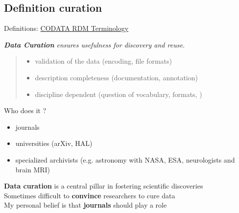 \documentclass[10pt,compress,serif,aspectratio=169]{beamer}
\begin{document}

%



\subsection{Definition curation}
\begin{frame}{Definitions: \href{https://zenodo.org/records/10626170}{CODATA RDM Terminology}}

\textit{\textbf{Data Curation} ensures usefulness for discovery and reuse.}\\
\begin{quote} 
\begin{itemize}
  \item validation of the data (encoding, file formats)
  \item description completeness (documentation, annotation)
  \item discipline dependent (question of vocabulary, formats, )
\end{itemize}
  \end{quote}

\pause
\vfill

Who does it ?
\begin{itemize}
  \item journals
  \item universities (arXiv, HAL)
  \item specialized archivists (e.g. astronomy with NASA, ESA, neurologists and brain MRI)
\end{itemize}
\pause
\vfill

\begin{center}
  \alert{{\Large\textbf{Data curation}} is a central pillar in fostering scientific discoveries}\\
\vfill
\pause
 \alert{Sometimes difficult to {\Large\textbf{convince}} researchers to cure data}\\
\vfill
\pause
  \alert{My personal belief is that {\Large \textbf{journals}} should play a role}

\end{center}
\end{frame}
\end{document}
